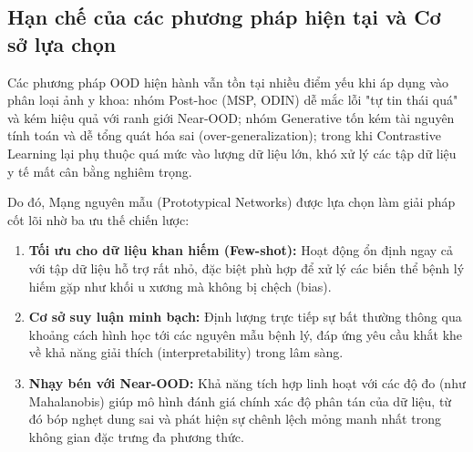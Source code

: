\subsection{Hạn chế của các phương pháp hiện tại và Cơ sở lựa chọn}

Các phương pháp OOD hiện hành vẫn tồn tại nhiều điểm yếu khi áp dụng vào phân loại ảnh y khoa: nhóm Post-hoc (MSP, ODIN) dễ mắc lỗi "tự tin thái quá" và kém hiệu quả với ranh giới Near-OOD; nhóm Generative tốn kém tài nguyên tính toán và dễ tổng quát hóa sai (over-generalization); trong khi Contrastive Learning lại phụ thuộc quá mức vào lượng dữ liệu lớn, khó xử lý các tập dữ liệu y tế mất cân bằng nghiêm trọng.

Do đó, Mạng nguyên mẫu (Prototypical Networks) được lựa chọn làm giải pháp cốt lõi nhờ ba ưu thế chiến lược:
\begin{enumerate}
\item \textbf{Tối ưu cho dữ liệu khan hiếm (Few-shot):} Hoạt động ổn định ngay cả với tập dữ liệu hỗ trợ rất nhỏ, đặc biệt phù hợp để xử lý các biến thể bệnh lý hiếm gặp như khối u xương mà không bị chệch (bias).
\item \textbf{Cơ sở suy luận minh bạch:} Định lượng trực tiếp sự bất thường thông qua khoảng cách hình học tới các nguyên mẫu bệnh lý, đáp ứng yêu cầu khắt khe về khả năng giải thích (interpretability) trong lâm sàng.
\item \textbf{Nhạy bén với Near-OOD:} Khả năng tích hợp linh hoạt với các độ đo (như Mahalanobis) giúp mô hình đánh giá chính xác độ phân tán của dữ liệu, từ đó bóp nghẹt dung sai và phát hiện sự chênh lệch mỏng manh nhất trong không gian đặc trưng đa phương thức.
\end{enumerate}